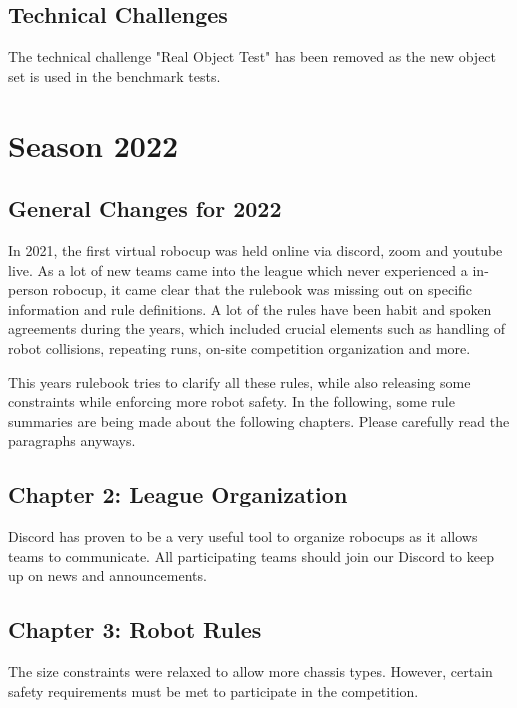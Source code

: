 \subsection{Technical Challenges}

The technical challenge "Real Object Test" has been removed as the new object set is used in the benchmark tests.



\section{Season 2022}

\subsection{General Changes for 2022}

In 2021, the first virtual robocup was held online via discord, zoom and youtube live.
As a lot of new teams came into the league which never experienced a in-person robocup,
it came clear that the rulebook was missing out on specific information and rule definitions.
A lot of the rules have been habit and spoken agreements during the years,
which included crucial elements such as handling of robot collisions, repeating runs,
on-site competition organization and more.

This years rulebook tries to clarify all these rules, while also releasing some constraints 
while enforcing more robot safety. In the following, 
some rule summaries are being made about the following chapters.
Please carefully read the paragraphs anyways.

\subsection{Chapter 2: League Organization}

Discord has proven to be a very useful tool to organize 
robocups as it allows teams to communicate. All participating teams should join our Discord to keep up on news and announcements.

\subsection{Chapter 3: Robot Rules}

The size constraints were relaxed to allow more chassis types.
However, certain safety requirements must be met to participate in the competition.

